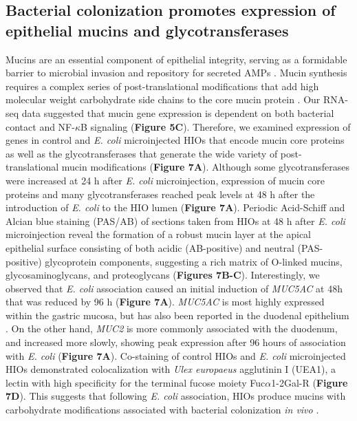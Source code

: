 \documentclass[9pt,lineo]{elife}
\begin{document}
\subsection*{{\bfseries\sffamily } Bacterial colonization promotes expression of epithelial mucins and glycotransferases}
\label{sec:orgheadline9}
Mucins are an essential component of epithelial integrity, serving as a formidable barrier to microbial invasion and repository for secreted AMPs \citep{Bergstrom:2013,Cornick:2015,Johansson:2016,Kim:2010}. Mucin synthesis requires a complex series of post-translational modifications that add high molecular weight carbohydrate side chains to the core mucin protein \citep{varki2017essentials}. Our RNA-seq data suggested that mucin gene expression is dependent on both bacterial contact and NF-\(\kappa\)B signaling (\textbf{Figure 5C}). Therefore, we examined expression of genes in control and \emph{E. coli} microinjected HIOs that encode mucin core proteins as well as the glycotransferases that generate the wide variety of post-translational mucin modifications (\textbf{Figure 7A}). Although some glycotransferases were increased at 24 h after \emph{E. coli} microinjection, expression of mucin core proteins and many glycotransferases reached peak levels at 48 h after the introduction of \emph{E. coli} to the HIO lumen (\textbf{Figure 7A}). Periodic Acid-Schiff and Alcian blue staining (PAS/AB) of sections taken from HIOs at 48 h after \emph{E. coli} microinjection reveal the formation of a robust mucin layer at the apical epithelial surface consisting of both acidic (AB-positive) and neutral (PAS-positive) glycoprotein components, suggesting a rich matrix of O-linked mucins, glycosaminoglycans, and proteoglycans (\textbf{Figures 7B-C}). Interestingly, we observed that \emph{E. coli} association caused an initial induction of \emph{MUC5AC} at 48h that was reduced by 96 h (\textbf{Figure 7A}). \emph{MUC5AC} is most highly expressed within the gastric mucosa, but has also been reported in the duodenal epithelium \citep{Buisine:1998,Buisine:2001,Rodriguez-Pineiro:2013}. On the other hand, \emph{MUC2} is more commonly associated with the duodenum, and increased more slowly, showing peak expression after 96 hours of association with \emph{E. coli} (\textbf{Figure 7A}). Co-staining of control HIOs and \emph{E. coli} microinjected HIOs demonstrated colocalization with \emph{Ulex europaeus} agglutinin I (UEA1), a lectin with high specificity for the terminal fucose moiety Fuc\(\alpha\)1-2Gal-R (\textbf{Figure 7D}). This suggests that following \emph{E. coli} association, HIOs produce mucins with carbohydrate modifications associated with bacterial colonization \emph{in vivo} \citep{Cash:2006,Hooper:1999,Goto:2014}.
\end{document}
